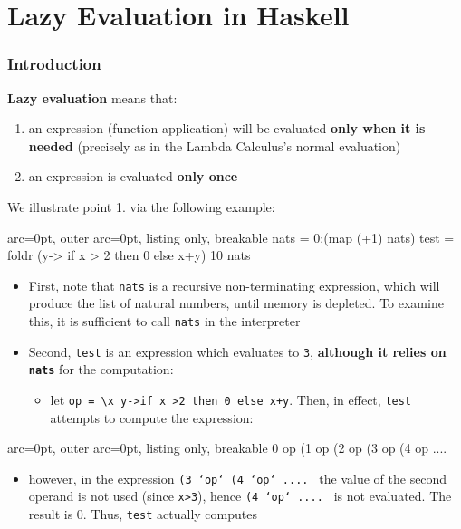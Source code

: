\section*{ Lazy Evaluation in Haskell }

\subsubsection*{ Introduction }
\textbf{Lazy evaluation} means that:
\begin{enumerate}
	\item  an expression (function application) will be evaluated \textbf{only when it is needed} (precisely as in the Lambda Calculus's normal evaluation)
	\item  an expression is evaluated \textbf{only once}
\end{enumerate}

 We illustrate point 1. via the following example:

\begin{tcblisting}{ arc=0pt, outer arc=0pt, listing only, breakable}
nats = 0:(map (+1) nats)
test = foldr (\x y-> if x > 2 then 0 else x+y) 10 nats

\end{tcblisting}


\begin{itemize}
	\item  First, note that \texttt{nats} is a recursive non-terminating expression, which will produce the list of natural numbers, until memory is depleted. To examine this, it is sufficient to call \texttt{nats} in the interpreter
	\item  Second, \texttt{test} is an expression which evaluates to \texttt{3}, \textbf{although it relies on \texttt{nats}} for the computation:

  \begin{itemize}
  	\item  let \texttt{op = \textbackslash x y-\textgreater  if x \textgreater  2 then 0 else x+y}. Then, in effect, \texttt{test} attempts to compute the expression:
  \end{itemize}
\end{itemize}


\begin{tcblisting}{ arc=0pt, outer arc=0pt, listing only, breakable}
0 op (1 op (2 op (3 op (4 op .... 

\end{tcblisting}

  \begin{itemize}
  	\item  however, in the expression \texttt{(3 `op` (4 `op` .... } the value of the second operand is not used (since \texttt{x\textgreater 3}), hence \texttt{(4 `op` .... } is not evaluated. The result is 0. Thus, \texttt{test} actually computes
  \end{itemize}


